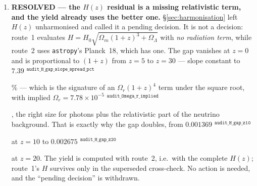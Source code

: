 \documentclass[11pt,a4paper]{article}
\newif\ifprovdraft
\newcommand{\src}[1]{%
  \ifprovdraft
    \ifmmode{}^{\text{\color{gray}\scriptsize\texttt{#1}}}%
    \else{\color{gray}\scriptsize$^{\texttt{#1}}$}%
    \fi
  \fi}
\begin{document}
\begin{enumerate}
      support of the photon integral begins at $\log_{10}E_{\rm th}$, and
      $10^{\log_{10}E_{\rm th}}$ evaluates one unit in the last place
      \emph{below} $E_{\rm th}$; the exact \texttt{>=} tests in
      \texttt{photon\_pdf} and \texttt{N\_gamma} therefore returned zero at the
      first grid point. Because the ionizing spectrum is steepest at threshold,
      the dropped trapezoid element was the \emph{largest} one. $\zeta_\gamma$
      moved from $4.631\times10^{-18}$ to
      $4.647\times10^{-18}$\src{zeta\_gamma\_s} ($+0.35\%$) and the ratio from
      $5579$ to $5599$\src{zeta\_ratio}; no conclusion changed. The band edges
      now compare with a relative tolerance ($10^{-12}$ of $13.6$~eV is
      $1.4\times10^{-11}$~eV), and the new check \texttt{C57} guards it by a
      route the code cannot argue with: the integral of
      Fig.~\ref{fig:result}(a) has a \emph{closed form}, $f_{\rm esc}\xi_{\rm
      ion}\rho_{\rm UV}$, and the test is not that the residual is small but
      that it converges at \emph{order two} --- clean trapezoid truncation
      falls as $h^2$, a dropped band edge only as $h$. Measured: order
      $2.00$ after the fix, $1.00$ with the bug reinstated. \textbf{Nothing
      caught this for six days because every other check compared the code
      against itself.}
\item \textbf{RESOLVED --- the $H(z)$ residual is a missing relativistic term,
      and the yield already uses the better one.} \S\ref{sec:harmonisation} left
      $H(z)$ unharmonised and called it a pending decision. It is not a
      decision: route~1 evaluates $H = H_0\sqrt{\Omega_m(1+z)^3+\Omega_\Lambda}$
      with \emph{no radiation term}, while route~2 uses \texttt{astropy}'s
      Planck~18, which has one. The gap vanishes at $z=0$ and is proportional to
      $(1+z)$ from $z=5$ to $z=30$ --- slope constant to
      $7.39$\src{audit\_H\_gap\_slope\_spread\_pct}\% --- which is the signature of an
      $\Omega_r(1+z)^4$ term under the square root, with implied $\Omega_r =
      7.78\times10^{-5}$\src{audit\_Omega\_r\_implied}, the right size for
      photons plus the relativistic part of the neutrino background. That is
      exactly why the gap doubles, from
      $0.001369$\src{audit\_H\_gap\_z10} at $z=10$ to
      $0.002675$\src{audit\_H\_gap\_z20} at $z=20$. The yield is computed with
      route~2, i.e.\ with the complete $H(z)$; route~1's $H$ survives only in the
      superseded cross-check. No action is needed, and the ``pending decision''
      is withdrawn.
\end{enumerate}
\end{document}
